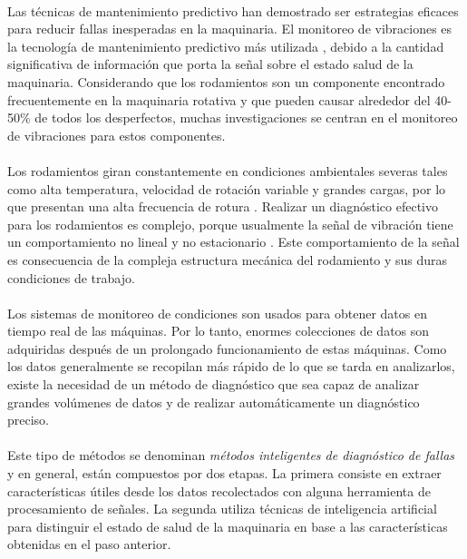 \documentclass[a4paper,12pt]{article}
\begin{document}
\paragraph{}
Las técnicas de mantenimiento predictivo han demostrado ser estrategias eficaces para reducir fallas inesperadas en la maquinaria. El monitoreo de vibraciones es la tecnología de mantenimiento predictivo más utilizada \cite{zhan}, debido a la cantidad significativa de información que porta la señal sobre el estado salud de la maquinaria. Considerando que los rodamientos son un componente encontrado frecuentemente en la maquinaria rotativa y que pueden causar alrededor del 40-50\% \cite{issam} de todos los desperfectos, muchas investigaciones se centran en el monitoreo de vibraciones para estos componentes.

\paragraph{}
Los rodamientos giran constantemente en condiciones ambientales severas tales como alta temperatura, velocidad de rotación variable y grandes cargas, por lo que presentan una alta frecuencia de rotura \cite{fu}. Realizar un diagnóstico efectivo para los rodamientos es complejo, porque usualmente la señal de vibración tiene un comportamiento no lineal y no estacionario \cite{li}. Este comportamiento de la señal es consecuencia de la compleja estructura mecánica del rodamiento y sus duras condiciones de trabajo.

\paragraph{}
Los sistemas de monitoreo de condiciones son usados para obtener datos en tiempo real de las máquinas. Por lo tanto, enormes colecciones de datos son adquiridas después de un prolongado funcionamiento de estas máquinas. Como los datos generalmente se recopilan más rápido de lo que se tarda en analizarlos, existe la necesidad de un método de diagnóstico que sea capaz de analizar grandes volúmenes de datos y de realizar automáticamente un diagnóstico preciso.

\paragraph{}
Este tipo de métodos se denominan \textit{métodos inteligentes de diagnóstico de fallas} y en general, están compuestos por dos etapas. La primera consiste en extraer características útiles desde los datos recolectados con alguna herramienta de procesamiento de señales. La segunda utiliza técnicas de inteligencia artificial para distinguir el estado de salud de la maquinaria en base a las características obtenidas en el paso anterior.
\end{document}
